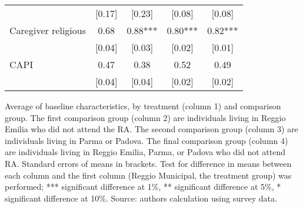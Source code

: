 \begin{table}[H]
\begin{tabular}{l cccc}
   &   [0.17]   &   [0.23]   &   [0.08]   &   [0.08] \\ 
Caregiver religious   &   0.68   &   0.88***   &   0.80***   &   0.82*** \\ 
   &   [0.04]   &   [0.03]   &   [0.02]   &   [0.01] \\ 
CAPI   &   0.47   &   0.38   &   0.52   &   0.49 \\ 
   &   [0.04]   &   [0.04]   &   [0.02]   &   [0.02] \\ 
\hline 
\end{tabular}
\vspace{1ex}

\raggedright{
\footnotesize{Average of baseline characteristics, by treatment (column 1) and comparison group.
The first comparison group (column 2) are individuals living in Reggio Emilia who did not attend the RA. The second comparison group (column 3) are individuals living in Parma or Padova. The final comparison group (column 4) are individuals living in Reggio Emilia, Parma, or Padova who did not attend RA.
Standard errors of means in brackets. Test for difference in means between each column and the first column (Reggio Municipal, the treatment group) was performed; *** significant difference at 1\%, ** significant difference at 5\%, * significant difference at 10\%. Source: authors calculation using survey data.}
}
\end{table}
